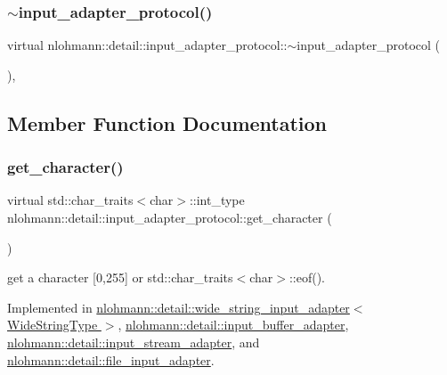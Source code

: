 \subsubsection{\texorpdfstring{$\sim$input\+\_\+adapter\+\_\+protocol()}{~input\_adapter\_protocol()}}
{\footnotesize\ttfamily virtual nlohmann\+::detail\+::input\+\_\+adapter\+\_\+protocol\+::$\sim$input\+\_\+adapter\+\_\+protocol (\begin{DoxyParamCaption}{ }\end{DoxyParamCaption})\hspace{0.3cm}{\ttfamily [virtual]}, {\ttfamily [default]}}



\subsection{Member Function Documentation}
\mbox{\label{structnlohmann_1_1detail_1_1input__adapter__protocol_aac10a6a4048a8ce8e2ed50277692a3ca}} 
\subsubsection{\texorpdfstring{get\+\_\+character()}{get\_character()}}
{\footnotesize\ttfamily virtual std\+::char\+\_\+traits$<$char$>$\+::int\+\_\+type nlohmann\+::detail\+::input\+\_\+adapter\+\_\+protocol\+::get\+\_\+character (\begin{DoxyParamCaption}{ }\end{DoxyParamCaption})\hspace{0.3cm}{\ttfamily [pure virtual]}}



get a character \mbox{[}0,255\mbox{]} or std\+::char\+\_\+traits$<$char$>$\+::eof(). 



Implemented in \hyperlink{classnlohmann_1_1detail_1_1wide__string__input__adapter_abb62b34cf77e557ce5321b7f2490c3b0}{nlohmann\+::detail\+::wide\+\_\+string\+\_\+input\+\_\+adapter$<$ Wide\+String\+Type $>$}, \hyperlink{classnlohmann_1_1detail_1_1input__buffer__adapter_ae9e195b04f3551fafb0925aafba00124}{nlohmann\+::detail\+::input\+\_\+buffer\+\_\+adapter}, \hyperlink{classnlohmann_1_1detail_1_1input__stream__adapter_ae0760af923583de6354725e901d1869d}{nlohmann\+::detail\+::input\+\_\+stream\+\_\+adapter}, and \hyperlink{classnlohmann_1_1detail_1_1file__input__adapter_a0d4ff48617c8f63c30babdfd09482329}{nlohmann\+::detail\+::file\+\_\+input\+\_\+adapter}.



